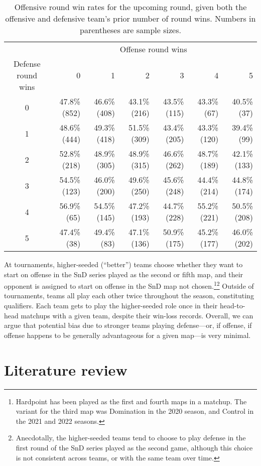 \documentclass{article}
\begin{document}
\begin{longtable}{crrrrrr}
\caption{Offensive round win rates for the upcoming round, given both the offensive and defensive team's prior number of round wins. Numbers in parentheses are sample sizes.}\label{tbl:cod-o-win-prop-by-series-state} \\
\toprule
& \multicolumn{6}{c}{Offense round wins} \\ 
\cmidrule(lr){2-7}
Defense round wins & 0 & 1 & 2 & 3 & 4 & 5 \\ 
\midrule
0 & 47.8\%
(852) & 46.6\%
(408) & 43.1\%
(216) & 43.5\%
(115) & 43.3\%
(67) & 40.5\%
(37) \\ 
1 & 48.6\%
(444) & 49.3\%
(418) & 51.5\%
(309) & 43.4\%
(205) & 43.3\%
(120) & 39.4\%
(99) \\ 
2 & 52.8\%
(218) & 48.9\%
(305) & 48.9\%
(315) & 46.6\%
(262) & 48.7\%
(189) & 42.1\%
(133) \\ 
3 & 54.5\%
(123) & 46.0\%
(200) & 49.6\%
(250) & 45.6\%
(248) & 44.4\%
(214) & 44.8\%
(174) \\ 
4 & 56.9\%
(65) & 54.5\%
(145) & 47.2\%
(193) & 44.7\%
(228) & 55.2\%
(221) & 50.5\%
(208) \\ 
5 & 47.4\%
(38) & 49.4\%
(83) & 47.1\%
(136) & 50.9\%
(175) & 45.2\%
(177) & 46.0\%
(202) \\ 
\bottomrule
\end{longtable}

At tournaments, higher-seeded (``better'') teams choose whether they
want to start on offense in the SnD series played as the second or fifth
map, and their opponent is assigned to start on offense in the SnD map
not chosen.\footnote{Hardpoint has been played as the first and fourth
  maps in a matchup. The variant for the third map was Domination in the
  2020 season, and Control in the 2021 and 2022 seasons.}\footnote{Anecdotally,
  the higher-seeded teams tend to choose to play defense in the first
  round of the SnD series played as the second game, although this
  choice is not consistent across teams, or with the same team over
  time.} Outside of tournaments, teams all play each other twice
throughout the season, constituting qualifiers. Each team gets to play
the higher-seeded role once in their head-to-head matchups with a given
team, despite their win-loss records. Overall, we can argue that
potential bias due to stronger teams playing defense---or, if offense,
if offense happens to be generally advantageous for a given map---is
very minimal.

\hypertarget{literature-review}{%
\section{Literature review}\label{literature-review}}
\end{document}
